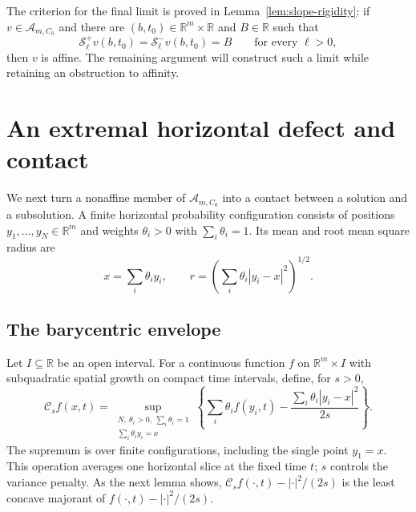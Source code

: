 \documentclass[11pt]{article}
\numberwithin{equation}{section}
\theoremstyle{definition}
\theoremstyle{remark}
\newcommand{\R}{\mathbb{R}}
\newcommand{\Cenv}{\mathcal{C}}
\newcommand{\Senv}{\mathcal{S}}
\newcommand{\Aclass}{\mathcal{A}}
\begin{document}
The criterion for the final limit is proved in
Lemma~\ref{lem:slope-rigidity}: if $v\in\Aclass_{m,C_0}$ and there are
$(b,t_0)\in\R^m\times\R$ and $B\in\R$ such that
\[
  \Senv_\ell^+v(b,t_0)=\Senv_\ell^-v(b,t_0)=B
       \qquad\text{for every }\ell>0,
\]
then $v$ is affine. The remaining argument will construct such a limit while
retaining an obstruction to affinity.

\section{An extremal horizontal defect and contact}\label{sec:envelope-contact}

We next turn a nonaffine member of $\Aclass_{m,C_0}$ into a
contact between a solution and a subsolution. A finite horizontal
probability configuration consists of positions
$y_1,\ldots,y_N\in\R^m$ and weights
$\theta_i>0$ with $\sum_i\theta_i=1$. Its mean and root mean
square radius are
\[
  x=\sum_i\theta_i y_i,\qquad
  r=\left(\sum_i\theta_i|y_i-x|^2\right)^{1/2}.
\]

\subsection{The barycentric envelope}

Let $I\subseteq\R$ be an open interval. For a continuous function $f$ on
$\R^m\times I$ with subquadratic spatial growth on compact time intervals,
define, for $s>0$,
\begin{equation}\label{eq:barycentric-envelope}
  \Cenv_s f(x,t)=
  \sup_{\substack{N,\ \theta_i>0,\ \sum_i\theta_i=1\\
                  \sum_i\theta_i y_i=x}}
   \left\{\sum_i\theta_i f(y_i,t)
             -\frac{\sum_i\theta_i|y_i-x|^2}{2s}\right\}.
\end{equation}
The supremum is over finite configurations, including the
single point $y_1=x$.
This operation averages one horizontal slice at the fixed time $t$;
$s$ controls the variance penalty. As the next lemma shows,
$\Cenv_s f(\cdot,t)-|\cdot|^2/(2s)$ is the least concave majorant of
$f(\cdot,t)-|\cdot|^2/(2s)$.
\end{document}
